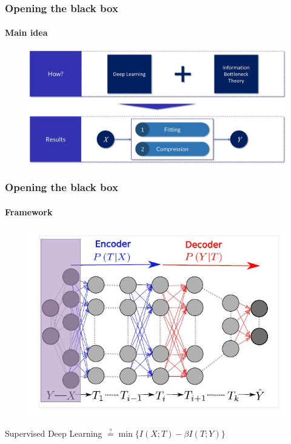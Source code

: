 \documentclass[10pt]{beamer}
\begin{document}
\begin{frame}
\frametitle{Opening the black box}
\framesubtitle{Main idea}
\begin{figure}
\centering
\includegraphics[scale=0.30]{figs/main-idea.jpeg}
\end{figure}
\end{frame}

\begin{frame}
\frametitle{Opening the black box}
\framesubtitle{Framework}
\begin{figure}
\centering
\includegraphics[scale=0.37]{figs/markov-chain-nn.jpeg}
\end{figure}
\vspace*{-4.5mm}
\begin{center}
Supervised Deep Learning $\stackrel{?}{=} \min \{I(X;T) - \beta I(T;Y)\} $
\end{center}
\end{frame}
\end{document}
